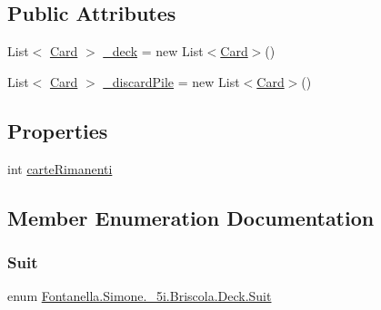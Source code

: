 \subsection*{Public Attributes}
\begin{DoxyCompactItemize}
\item 
List$<$ \hyperlink{class_fontanella_1_1_simone_1_1__5i_1_1_briscola_1_1_card}{Card} $>$ \hyperlink{class_fontanella_1_1_simone_1_1__5i_1_1_briscola_1_1_deck_a5dc9a572ca0d289f9726513ecdaf5203}{\+\_\+deck} = new List$<$\hyperlink{class_fontanella_1_1_simone_1_1__5i_1_1_briscola_1_1_card}{Card}$>$()
\item 
List$<$ \hyperlink{class_fontanella_1_1_simone_1_1__5i_1_1_briscola_1_1_card}{Card} $>$ \hyperlink{class_fontanella_1_1_simone_1_1__5i_1_1_briscola_1_1_deck_a065f7dd81106ac0d3856034059a02977}{\+\_\+discard\+Pile} = new List$<$\hyperlink{class_fontanella_1_1_simone_1_1__5i_1_1_briscola_1_1_card}{Card}$>$()
\end{DoxyCompactItemize}
\subsection*{Properties}
\begin{DoxyCompactItemize}
\item 
int \hyperlink{class_fontanella_1_1_simone_1_1__5i_1_1_briscola_1_1_deck_aa18c1840ad50ac7c015b5bcc34c1892f}{carte\+Rimanenti}
\end{DoxyCompactItemize}


\subsection{Member Enumeration Documentation}
\hypertarget{class_fontanella_1_1_simone_1_1__5i_1_1_briscola_1_1_deck_a7f82994e5bc71f3c6ab33157e02554ea}{}\label{class_fontanella_1_1_simone_1_1__5i_1_1_briscola_1_1_deck_a7f82994e5bc71f3c6ab33157e02554ea} 
\subsubsection{\texorpdfstring{Suit}{Suit}}
{\footnotesize\ttfamily enum \hyperlink{class_fontanella_1_1_simone_1_1__5i_1_1_briscola_1_1_deck_a7f82994e5bc71f3c6ab33157e02554ea}{Fontanella.\+Simone.\+\_\+5i.\+Briscola.\+Deck.\+Suit}\hspace{0.3cm}{\ttfamily [strong]}}

